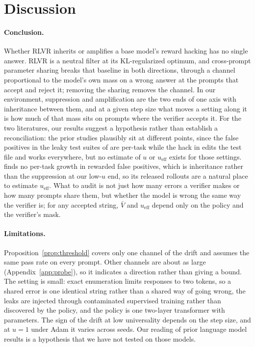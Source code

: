 \documentclass{article}
\theoremstyle{definition}
\newcommand{\ueff}{u_{\mathrm{eff}}}
\begin{document}
\section{Discussion}

\paragraph{Conclusion.} Whether RLVR inherits or amplifies a base model's reward hacking has no single answer. RLVR is a neutral filter at its KL-regularized optimum, and cross-prompt parameter sharing breaks that baseline in both directions, through a channel proportional to the model's own mass on a wrong answer at the prompts that accept and reject it; removing the sharing removes the channel. In our environment, suppression and amplification are the two ends of one axis with inheritance between them, and at a given step size what moves a setting along it is how much of that mass sits on prompts where the verifier accepts it. For the two literatures, our results suggest a hypothesis rather than establish a reconciliation: the prior studies plausibly sit at different points, since the false positives in the leaky test suites of \citet{zhang2026leaky} are per-task while the hack in \citet{khalifa2026countdown} edits the test file and works everywhere, but no estimate of $u$ or $\ueff$ exists for those settings. \citet{zhang2026leaky} finds no per-task growth in rewarded false positives, which is inheritance rather than the suppression at our low-$u$ end, so its released rollouts are a natural place to estimate $\ueff$. What to audit is not just how many errors a verifier makes or how many prompts share them, but whether the model is wrong the same way the verifier is; for any accepted string, $\bar V$ and $\ueff$ depend only on the policy and the verifier's mask.

\paragraph{Limitations.} Proposition~\ref{prop:threshold} covers only one channel of the drift and assumes the same pass rate on every prompt. Other channels are about as large (Appendix~\ref{app:probe}), so it indicates a direction rather than giving a bound. The setting is small: exact enumeration limits responses to two tokens, so a shared error is one identical string rather than a shared way of going wrong, the leaks are injected through contaminated supervised training rather than discovered by the policy, and the policy is one two-layer transformer with \NParams{} parameters. The sign of the drift at low universality depends on the step size, and at $u=1$ under Adam it varies across seeds. Our reading of prior language model results is a hypothesis that we have not tested on those models.
\end{document}
